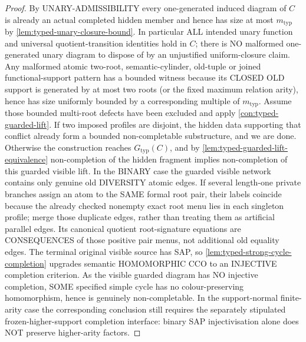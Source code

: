\begin{proof}
By UNARY-ADMISSIBILITY every one-generated induced
diagram of \(C\) is already an actual completed hidden
member and hence has size at most \(m_{\mathrm{typ}}\)
by \cref{lem:typed-unary-closure-bound}. In particular
ALL intended unary function and universal
quotient-transition identities hold in \(C\);
there is NO malformed one-generated unary diagram
to dispose of by an unjustified uniform-closure claim.
Any malformed atomic two-root, semantic-cylinder,
old-tuple or joined functional-support pattern has
a bounded witness because its CLOSED OLD support
is generated by at most two roots (or the fixed
maximum relation arity), hence has size uniformly
bounded by a corresponding multiple of \(m_{\mathrm{typ}}\).
Assume those bounded multi-root defects have been
excluded and apply \cref{con:typed-guarded-lift}.  If two imposed
profiles are disjoint, the hidden data supporting that conflict already form
a bounded non-completable substructure, and we are done.  Otherwise the
construction reaches \(G_{\mathrm{typ}}(C)\), and by
\cref{lem:typed-guarded-lift-equivalence} non-completion of the hidden
fragment implies non-completion of this guarded visible lift.  In the BINARY case the guarded visible network contains
only genuine old DIVERSITY atomic edges. If several length-one
private branches assign an atom to the SAME formal root pair,
their labels coincide because the already checked nonempty exact
root menu lies in each singleton profile; merge those duplicate
edges, rather than treating them as artificial parallel edges.
Its canonical quotient root-signature equations are CONSEQUENCES
of those positive pair menus, not additional old equality edges.
The terminal original visible source has SAP, so
\cref{lem:typed-strong-cycle-completion} upgrades semantic
HOMOMORPHIC CCO to an INJECTIVE completion criterion.
As the visible guarded diagram has NO injective completion,
SOME specified simple cycle has no colour-preserving
homomorphism, hence is genuinely non-completable.
In the support-normal finite-arity case the corresponding
conclusion still requires the separately stipulated
frozen-higher-support completion interface: binary SAP
injectivisation alone does NOT preserve higher-arity factors.


\end{proof}
